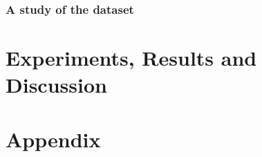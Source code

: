 \documentclass{article} %
\begin{document}
   \subsubsection{A study of the dataset}
   

\section{Experiments, Results and Discussion}  




\appendix
\section{Appendix}
\end{document}
